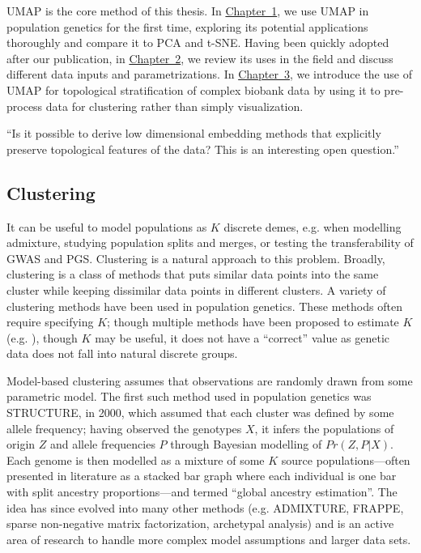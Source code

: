 UMAP is the core method of this thesis. In \hyperref[chap:chapter1]{Chapter~1}, we use UMAP in population genetics for the first time, exploring its potential applications thoroughly and compare it to PCA and t-SNE. Having been quickly adopted after our publication, in \hyperref[chap:chapter2]{Chapter~2}, we review its uses in the field and discuss different data inputs and parametrizations. In \hyperref[chap:chapter3]{Chapter~3}, we introduce the use of UMAP for topological stratification of complex biobank data by using it to pre-process data for clustering rather than simply visualization.

``Is it possible to derive low dimensional embedding methods that explicitly preserve topological features of the data? This is an interesting open question.''\citep{wasserman_topological_2018}

\subsection{Clustering}

It can be useful to model populations as $K$ discrete demes, e.g. when modelling admixture, studying population splits and merges, or testing the transferability of GWAS and PGS. Clustering is a natural approach to this problem. Broadly, clustering is a class of methods that puts similar data points into the same cluster while keeping dissimilar data points in different clusters\citep{ben-david_clustering_2018}. A variety of clustering methods have been used in population genetics. These methods often require specifying $K$; though multiple methods have been proposed to estimate $K$ (e.g. \citep{evanno_detecting_2005,verity_estimating_2016}), though $K$ may be useful, it does not have a ``correct'' value as genetic data does not fall into natural discrete groups\citep{lawson_tutorial_2018}.

Model-based clustering assumes that observations are randomly drawn from some parametric model. The first such method used in population genetics was STRUCTURE, in 2000, which assumed that each cluster was defined by some allele frequency; having observed the genotypes $X$, it infers the populations of origin $Z$ and allele frequencies $P$ through Bayesian modelling of $Pr(Z, P|X)$\citep{pritchard_inference_2000}. Each genome is then modelled as a mixture of some $K$ source populations---often presented in literature as a stacked bar graph where each individual is one bar with split ancestry proportions---and termed ``global ancestry estimation''\citep{alexander_fast_2009}. The idea has since evolved into many other methods (e.g. ADMIXTURE\citep{alexander_fast_2009}, FRAPPE\citep{tang_estimation_2005}, sparse non-negative matrix factorization\citep{frichot_fast_2014}, archetypal analysis\citep{gimbernat-mayol_archetypal_2022}) and is an active area of research to handle more complex model assumptions and larger data sets.

